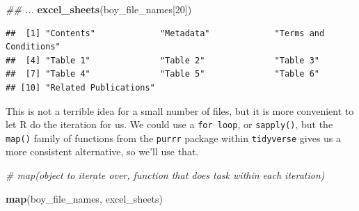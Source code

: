 \documentclass[
]{book}
\newenvironment{Shaded}{\begin{snugshade}}{\end{snugshade}}
\newcommand{\CommentTok}[1]{\textcolor[rgb]{0.56,0.35,0.01}{\textit{#1}}}
\newcommand{\DecValTok}[1]{\textcolor[rgb]{0.00,0.00,0.81}{#1}}
\newcommand{\KeywordTok}[1]{\textcolor[rgb]{0.13,0.29,0.53}{\textbf{#1}}}
\newcommand{\NormalTok}[1]{#1}
\begin{document}
\begin{Shaded}
\begin{Highlighting}[]
\CommentTok{\#\# ...}
\KeywordTok{excel\_sheets}\NormalTok{(boy\_file\_names[}\DecValTok{20}\NormalTok{])}
\end{Highlighting}
\end{Shaded}

\begin{verbatim}
##  [1] "Contents"             "Metadata"             "Terms and Conditions"
##  [4] "Table 1"              "Table 2"              "Table 3"             
##  [7] "Table 4"              "Table 5"              "Table 6"             
## [10] "Related Publications"
\end{verbatim}

This is not a terrible idea for a small number of files, but it is
more convenient to let R do the iteration for us. We could use a \texttt{for\ loop},
or \texttt{sapply()}, but the \texttt{map()} family of functions from the \texttt{purrr}
package within \texttt{tidyverse} gives us a more consistent alternative,
so we'll use that.

\begin{Shaded}
\begin{Highlighting}[]
\CommentTok{\# map(object to iterate over, function that does task within each iteration)}

\KeywordTok{map}\NormalTok{(boy\_file\_names, excel\_sheets)}
\end{Highlighting}
\end{Shaded}
\end{document}
